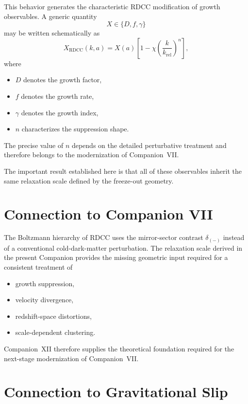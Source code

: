 \documentclass[11pt,a4paper]{article}
\begin{document}
This behavior generates the characteristic RDCC modification of growth
observables. A generic quantity
\begin{equation}
  X \in \{D, f, \gamma\}
\end{equation}
may be written schematically as
\begin{equation}
  X_{\mathrm{RDCC}}(k,a)
  =
  X(a)
  \left[
    1
    -
    \chi
    \left(
      \frac{k}{k_{\mathrm{rel}}}
    \right)^{n}
  \right],
\end{equation}
where
\begin{itemize}
  \item \(D\) denotes the growth factor,
  \item \(f\) denotes the growth rate,
  \item \(\gamma\) denotes the growth index,
  \item \(n\) characterizes the suppression shape.
\end{itemize}
The precise value of \(n\) depends on the detailed perturbative treatment and
therefore belongs to the modernization of Companion~VII.

The important result established here is that all of these observables inherit
the same relaxation scale defined by the freeze-out geometry.

\section{Connection to Companion VII}

The Boltzmann hierarchy of RDCC uses the mirror-sector contrast
\(\delta_{(-)}\) instead of a conventional cold-dark-matter perturbation. The
relaxation scale derived in the present Companion provides the missing
geometric input required for a consistent treatment of
\begin{itemize}
  \item growth suppression,
  \item velocity divergence,
  \item redshift-space distortions,
  \item scale-dependent clustering.
\end{itemize}
Companion~XII therefore supplies the theoretical foundation required for the
next-stage modernization of Companion~VII.
\section{Connection to Gravitational Slip}
\end{document}
